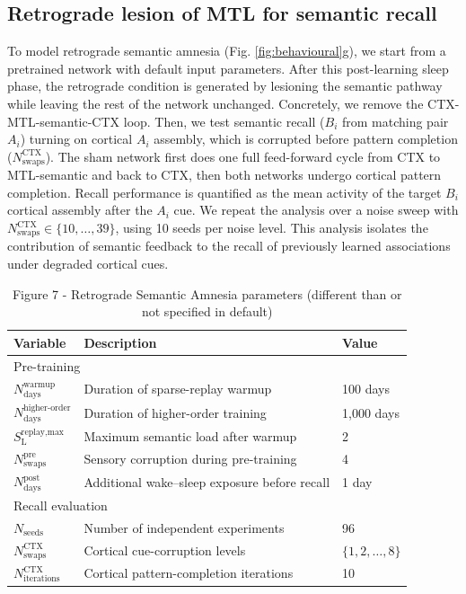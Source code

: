 \documentclass{article}
\begin{document}
\subsection*{Retrograde lesion of MTL for semantic recall}
To model retrograde semantic amnesia (Fig. \ref{fig:behavioural}g), we start from a pretrained network with default input parameters.
\newline\newline
After this post-learning sleep phase, the retrograde condition is generated by lesioning the semantic pathway while leaving the rest of the network unchanged. Concretely, we remove the CTX-MTL-semantic-CTX loop.
\newline\newline
Then, we test semantic recall ($B_i$ from matching pair $A_i$) turning on cortical $A_i$ assembly, which is corrupted before pattern completion ($N_\mathrm{swaps}^{\mathrm{CTX}}$). The sham network first does one full feed-forward cycle from CTX to MTL-semantic and back to CTX, then both networks undergo cortical pattern completion. Recall performance is quantified as the mean activity of the target $B_i$ cortical assembly after the $A_i$ cue.
\newline\newline
We repeat the analysis over a noise sweep with $N_\mathrm{swaps}^{\mathrm{CTX}}\in\{10,\dots,39\}$, using 10 seeds per noise level. This analysis isolates the contribution of semantic feedback to the recall of previously learned associations under degraded cortical cues.
\begin{table}[h!]
\centering
\caption{Figure 7 - Retrograde Semantic Amnesia parameters (different than or not specified in default)}
\label{tab:retrograde_amnesia}
\begin{tabular}{lll}
\toprule
\textbf{Variable} & \textbf{Description} & \textbf{Value} \\
\midrule
\multicolumn{3}{l}{Pre-training} \\
$N_{\textrm{days}}^{\textrm{warmup}}$ & Duration of sparse-replay warmup & 100 days \\
$N_{\textrm{days}}^{\textrm{higher-order}}$ & Duration of higher-order training & 1,000 days \\
$S_{\textrm{L}}^{\textrm{replay,max}}$ & Maximum semantic load after warmup & 2 \\
$N_{\textrm{swaps}}^{\textrm{pre}}$ & Sensory corruption during pre-training & 4 \\
$N_{\textrm{days}}^{\textrm{post}}$ & Additional wake--sleep exposure before recall & 1 day \\
\midrule
\multicolumn{3}{l}{Recall evaluation} \\
$N_{\textrm{seeds}}$ & Number of independent experiments & 96 \\
$N_{\textrm{swaps}}^{\textrm{CTX}}$ & Cortical cue-corruption levels & $\{1,2,\ldots,8\}$ \\
$N_{\textrm{iterations}}^{\textrm{CTX}}$ & Cortical pattern-completion iterations & 10 \\
\bottomrule
\end{tabular}
\end{table}
\clearpage
\end{document}
